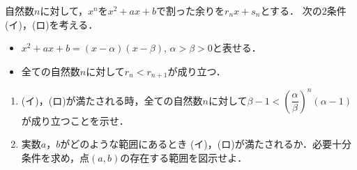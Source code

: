 \documentclass[../../main.tex]{subfiles}
\begin{document}
自然数$n$に対して，$x^n$を$x^2+ax+b$で割った余りを$r_nx+s_n$とする．
次の$2$条件(イ)，(ロ)を考える．
\begin{itemize}
  \item[(イ)] $x^2+ax+b=(x-\alpha)(x-\beta),\, \alpha>\beta>0$と表せる．
  \item[(ロ)] 全ての自然数$n$に対して$r_n<r_{n+1}$が成り立つ．
\end{itemize}
\begin{enumerate}
  \item (イ)，(ロ)が満たされる時，全ての自然数$n$に対して${\displaystyle \beta-1<\left(\dfrac{\alpha}{\beta}\right)^n(\alpha-1)}$が成り立つことを示せ．
  \item 実数$a$，$b$がどのような範囲にあるとき (イ)，(ロ)が満たされるか．必要十分条件を求め，点$(a,b)$の存在する範囲を図示せよ．
\end{enumerate}
\end{document}
